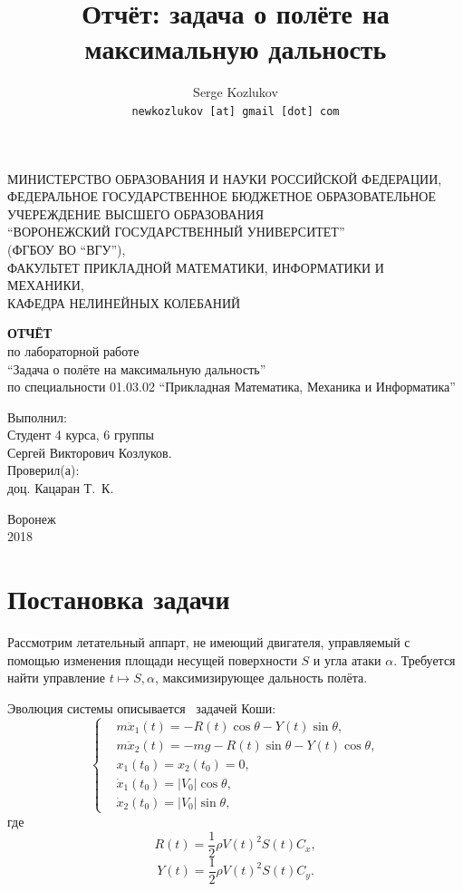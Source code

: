 \documentclass{article}
\title{Отчёт: задача о полёте на максимальную дальность}
\author{Serge Kozlukov\\ \texttt{newkozlukov [at] gmail [dot] com}}
\begin{document}
\thispagestyle{empty}
\begin{center}
МИНИСТЕРСТВО ОБРАЗОВАНИЯ И НАУКИ РОССИЙСКОЙ ФЕДЕРАЦИИ,\\
ФЕДЕРАЛЬНОЕ ГОСУДАРСТВЕННОЕ БЮДЖЕТНОЕ ОБРАЗОВАТЕЛЬНОЕ
УЧЕРЕЖДЕНИЕ ВЫСШЕГО ОБРАЗОВАНИЯ\\
``ВОРОНЕЖСКИЙ ГОСУДАРСТВЕННЫЙ УНИВЕРСИТЕТ''\\
(ФГБОУ ВО ``ВГУ''),\\
ФАКУЛЬТЕТ ПРИКЛАДНОЙ МАТЕМАТИКИ, ИНФОРМАТИКИ И МЕХАНИКИ,\\
КАФЕДРА НЕЛИНЕЙНЫХ КОЛЕБАНИЙ
\end{center}
\vfill
\begin{center}
  \textbf{ОТЧЁТ}\\[1.5cm]
  по лабораторной работе\\
  ``Задача о полёте на максимальную дальность''\\
  по специальности 01.03.02 ``Прикладная Математика, Механика и Информатика''
\end{center}
\vfill
\begin{flushright}
  Выполнил:\\
  Студент 4 курса, 6 группы\\
  Сергей Викторович Козлуков.\\
  Проверил(а):\\
  доц. Кацаран Т.~К.
\end{flushright}
\begin{center}
  Воронеж\\2018
\end{center}

\clearpage
\tableofcontents

\section{Постановка задачи}
Рассмотрим летательный аппарт, не имеющий двигателя, управляемый с помощью
изменения площади несущей поверхности \( S \) и угла атаки \( \alpha \).
Требуется найти управление \(t\mapsto S, \alpha\), максимизирующее дальность полёта.

Эволюция системы описывается~\cite{katsaran1} задачей Коши:
\begin{equation}
  \left\{
    \begin{aligned}
      & m\ddot x_1(t) = - R(t)\cos\theta - Y(t)\sin\theta,\\
      & m\ddot x_2(t) = - mg - R(t)\sin\theta - Y(t)\cos\theta,\\
      & x_1(t_0) = x_2(t_0) = 0,\\
      & \dot x_1(t_0) = |V_0|\cos\theta,\\
      & \dot x_2(t_0) = |V_0|\sin\theta,
      \end{aligned}
  \right.
\end{equation}
где
\[ R(t) = \frac12 \rho V(t)^2 S(t) C_x,\]
\[ Y(t) = \frac12 \rho V(t)^2 S(t) C_y.\]
\end{document}
